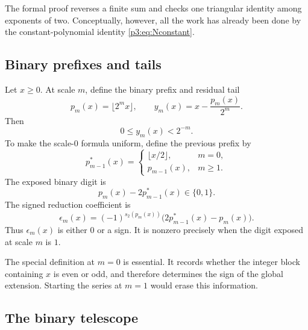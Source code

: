 \documentclass[11pt,oneside]{article}
\theoremstyle{definition}
\theoremstyle{remark}
\begin{document}
The formal proof reverses a finite sum and checks one triangular identity
among exponents of two.  Conceptually, however, all the work has already
been done by the constant-polynomial identity
\eqref{p3:eq:Nconstant}.

\subsection{Binary prefixes and tails}

Let $x\ge0$.  At scale $m$, define the binary prefix and residual tail
\begin{equation}\label{p3:eq:prefixTail}
 p_m(x)=\lfloor2^mx\rfloor,
 \qquad
 y_m(x)=x-\frac{p_m(x)}{2^m}.
\end{equation}
Then
\begin{equation}\label{p3:eq:tailbounds}
 0\le y_m(x)<2^{-m}.
\end{equation}
To make the scale-$0$ formula uniform, define the previous prefix by
\begin{equation}\label{p3:eq:previousPrefix}
 p_{m-1}^{*}(x)=
 \begin{cases}
  \lfloor x/2\rfloor,&m=0,\\
  p_{m-1}(x),&m\ge1.
 \end{cases}
\end{equation}
The exposed binary digit is
\[
 p_m(x)-2p_{m-1}^{*}(x)\in\{0,1\}.
\]
The signed reduction coefficient is
\begin{equation}\label{p3:eq:epsilonm}
 \epsilon_m(x)=
 (-1)^{s_2(p_m(x))}
 \bigl(2p_{m-1}^{*}(x)-p_m(x)\bigr).
\end{equation}
Thus $\epsilon_m(x)$ is either $0$ or a sign.  It is nonzero precisely when
the digit exposed at scale $m$ is $1$.

The special definition at $m=0$ is essential.  It records whether the
integer block containing $x$ is even or odd, and therefore determines the
sign of the global extension.  Starting the series at $m=1$ would erase this
information.

\subsection{The binary telescope}
\end{document}
